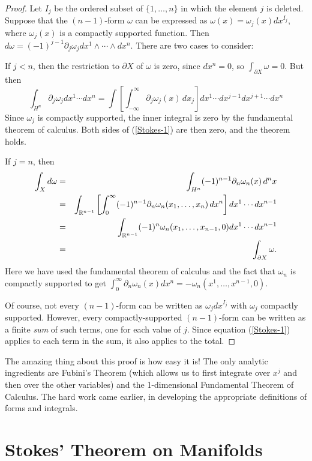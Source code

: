 \documentclass[12pt]{amsbook}
\newcommand{\R}{{\mathbb R}}
\theoremstyle{definition}
\begin{document}
\begin{proof} Let $I_j$ be the ordered subset of $\{1,\ldots,n\}$ in which
the element $j$ is deleted. Suppose that the $(n-1)$-form $\omega$ can 
be expressed as
$\omega(x) = \omega_j(x) dx^{I_j}$, where $\omega_j(x)$ is 
a compactly supported function. Then $d \omega = (-1)^{j-1} \partial_j \omega_j
dx^1 \wedge \cdots \wedge dx^n$. There are two cases to consider:

If $j<n$, then the restriction to $\partial X$ of $\omega$ is zero, since 
$dx^n=0$, so $\int_{\partial X} \omega = 0$. But then
$$\int_{H^n} \partial_j \omega_j
dx^1 \cdots dx^n = \int \left [ \int_{-\infty}^\infty \partial_j \omega_j(x) \, dx_j
\right ] dx^1\cdots dx^{j-1} dx^{j+1} \cdots dx^n$$
Since $\omega_j$ is compactly supported, the inner integral is zero by
the fundamental theorem of calculus. Both sides of (\ref{Stokes-1}) are then
zero, and the theorem holds. 

If $j=n$, then 
\begin{eqnarray}
\int_X d\omega &=& 
 \int_{H^n} (-1)^{n-1} \partial_n \omega_n(x) \, d^nx \cr 
&=& \int_{\R^{n-1}} 
\left [ \int_0^\infty (-1)^{n-1} \partial_n \omega_n(x_1,\ldots,x_n)\, dx^n \right ]
dx^1 \cdots dx^{n-1} \cr 
& = & \int_{\R^{n-1}} (-1)^{n} \omega_n(x_1,\ldots,x_{n-1},0) dx^1\cdots dx^{n-1} \cr
& = & \int_{\partial X} \omega.
\end{eqnarray}
Here we have used the fundamental theorem of calculus and the fact that 
$\omega_n$ is compactly supported to get $\int_0^\infty \partial_n \omega_n(x)dx^n
= - \omega_n(x^1,\ldots,x^{n-1},0)$. 

Of course, not every $(n-1)$-form can be written as $\omega_j dx^{I_j}$ with
$\omega_j$ compactly supported. However, every compactly-supported $(n-1)$-form
can be written as a finite {\em sum} of such terms, one for each
value of $j$. Since equation
(\ref{Stokes-1}) applies to each term in the sum, it also applies to the total. 
\end{proof}

The amazing thing about this proof is how easy it is! The only
analytic ingredients are Fubini's Theorem (which allows us to first
integrate over $x^j$ and then over the other variables) and the
1-dimensional Fundamental Theorem of Calculus. The hard work came earlier,
in developing the appropriate definitions of forms and integrals. 


\section{Stokes' Theorem on Manifolds}
\end{document}
